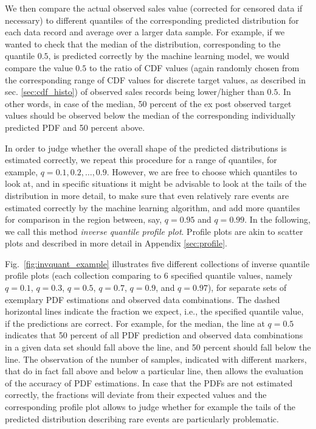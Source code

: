 \documentclass[BCOR=1mm, DIV=calc,10pt,
twoside=true,
twocolumn,
headings=normal]{scrartcl}
\newcommand{\fig}{Fig.~}
\begin{document}
We then compare the actual observed sales value (corrected for censored data if necessary) to different quantiles of the corresponding predicted distribution for each data record and average over a larger data sample. For example, if we wanted to check that the median of the distribution, corresponding to the quantile $0.5$, is predicted correctly by the machine learning model, we would compare the value $0.5$ to the ratio of CDF values (again randomly chosen from the corresponding range of CDF values for discrete target values, as described in sec. \ref{sec:cdf_histo}) of observed sales records being lower/higher than $0.5$. In other words, in case of the median, 50 percent of the ex post observed target values should be observed below the median of the corresponding individually predicted PDF and 50 percent above.

In order to judge whether the overall shape of the predicted distributions is estimated correctly, we repeat this procedure for a range of quantiles, for example, $q = 0.1, 0.2, \ldots, 0.9$. However, we are free to choose which quantiles to look at, and in specific situations it might be advisable to look at the tails of the distribution in more detail, to make sure that even relatively rare events are estimated correctly by the machine learning algorithm, and add more quantiles for comparison in the region between, say, $q = 0.95$ and $q = 0.99$. In the following, we call this method {\em inverse quantile profile plot}. Profile plots are akin to scatter plots and described in more detail in Appendix \ref{sec:profile}.

\fig \ref{fig:invquant_example} illustrates five different collections of inverse quantile profile plots (each collection comparing to 6 specified quantile values, namely $q = 0.1$, $q = 0.3$, $q = 0.5$, $q = 0.7$, $q = 0.9$, and $q = 0.97$), for separate sets of exemplary PDF estimations and observed data combinations. The dashed horizontal lines indicate the fraction we expect, i.e., the specified quantile value, if the predictions are correct. For example, for the median, the line at $q = 0.5$ indicates that  50 percent of all PDF prediction and observed data combinations in a given data set should fall above the line, and 50 percent should fall below the line. The observation of the number of samples, indicated with different markers, that do in fact fall above and below a particular line, then allows the evaluation of the accuracy of PDF estimations. In case that the PDFs are not estimated correctly, the fractions will deviate from their expected values and the corresponding profile plot allows to judge whether for example the tails of the predicted distribution describing rare events are particularly problematic.
\end{document}
